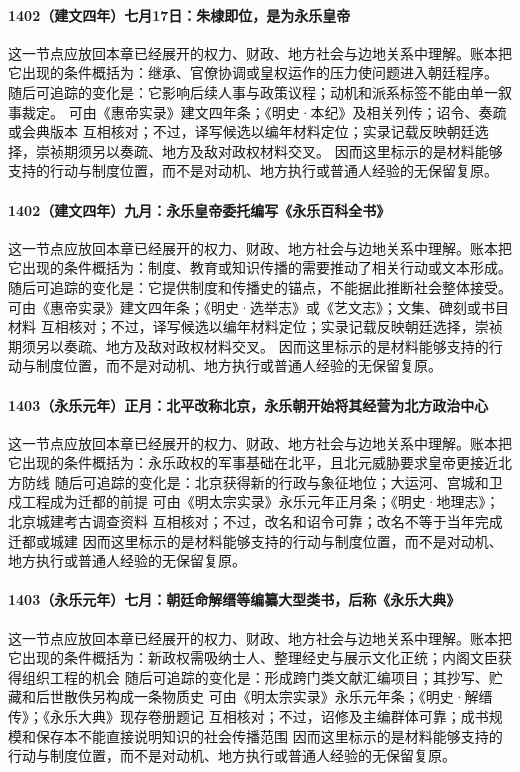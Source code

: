 \paragraph{1402（建文四年）七月17日：朱棣即位，是为永乐皇帝} 这一节点应放回本章已经展开的权力、财政、地方社会与边地关系中理解。账本把它出现的条件概括为：继承、官僚协调或皇权运作的压力使问题进入朝廷程序。 随后可追踪的变化是：它影响后续人事与政策议程；动机和派系标签不能由单一叙事裁定。 可由《惠帝实录》建文四年条；《明史·本纪》及相关列传；诏令、奏疏或会典版本 互相核对；不过，译写候选以编年材料定位；实录记载反映朝廷选择，崇祯期须另以奏疏、地方及敌对政权材料交叉。 因而这里标示的是材料能够支持的行动与制度位置，而不是对动机、地方执行或普通人经验的无保留复原。

\paragraph{1402（建文四年）九月：永乐皇帝委托编写《永乐百科全书》} 这一节点应放回本章已经展开的权力、财政、地方社会与边地关系中理解。账本把它出现的条件概括为：制度、教育或知识传播的需要推动了相关行动或文本形成。 随后可追踪的变化是：它提供制度和传播史的锚点，不能据此推断社会整体接受。 可由《惠帝实录》建文四年条；《明史·选举志》或《艺文志》；文集、碑刻或书目材料 互相核对；不过，译写候选以编年材料定位；实录记载反映朝廷选择，崇祯期须另以奏疏、地方及敌对政权材料交叉。 因而这里标示的是材料能够支持的行动与制度位置，而不是对动机、地方执行或普通人经验的无保留复原。

\paragraph{1403（永乐元年）正月：北平改称北京，永乐朝开始将其经营为北方政治中心} 这一节点应放回本章已经展开的权力、财政、地方社会与边地关系中理解。账本把它出现的条件概括为：永乐政权的军事基础在北平，且北元威胁要求皇帝更接近北方防线 随后可追踪的变化是：北京获得新的行政与象征地位；大运河、宫城和卫戍工程成为迁都的前提 可由《明太宗实录》永乐元年正月条；《明史·地理志》；北京城建考古调查资料 互相核对；不过，改名和诏令可靠；改名不等于当年完成迁都或城建 因而这里标示的是材料能够支持的行动与制度位置，而不是对动机、地方执行或普通人经验的无保留复原。

\paragraph{1403（永乐元年）七月：朝廷命解缙等编纂大型类书，后称《永乐大典》} 这一节点应放回本章已经展开的权力、财政、地方社会与边地关系中理解。账本把它出现的条件概括为：新政权需吸纳士人、整理经史与展示文化正统；内阁文臣获得组织工程的机会 随后可追踪的变化是：形成跨门类文献汇编项目；其抄写、贮藏和后世散佚另构成一条物质史 可由《明太宗实录》永乐元年条；《明史·解缙传》；《永乐大典》现存卷册题记 互相核对；不过，诏修及主编群体可靠；成书规模和保存本不能直接说明知识的社会传播范围 因而这里标示的是材料能够支持的行动与制度位置，而不是对动机、地方执行或普通人经验的无保留复原。

